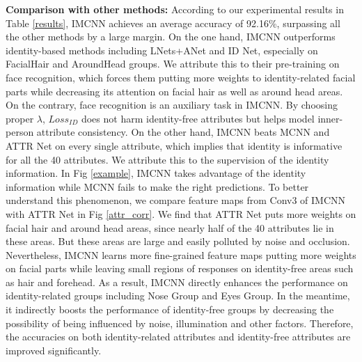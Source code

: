 \documentclass[wcp]{jmlr}
\begin{document}
	\textbf{Comparison with other methods:} According to our experimental results in Table \ref{results}, IMCNN achieves an average accuracy of 92.16\%, surpassing all the other methods by a large margin. On the one hand, IMCNN outperforms identity-based methods including LNets+ANet and ID Net, especially on FacialHair and AroundHead groups. We attribute this to their pre-training on face recognition, which forces them putting more weights to identity-related facial parts while decreasing its attention on facial hair as well as around head areas. On the contrary, face recognition is an auxiliary task in IMCNN. By choosing proper $\lambda$, $Loss_{ID}$ does not harm identity-free attributes but helps model inner-person attribute consistency. On the other hand, IMCNN beats MCNN and ATTR Net on every single attribute, which implies that identity is informative for all the 40 attributes. We attribute this to the supervision of the identity information. In Fig \ref{example}, IMCNN takes advantage of the identity information while MCNN fails to make the right predictions. To better understand this phenomenon, we compare feature maps from Conv3 of IMCNN with ATTR Net in Fig \ref{attr_corr}. We find that ATTR Net puts more weights on facial hair and around head areas, since nearly half of the 40 attributes lie in these areas. But these areas are large and easily polluted by noise and occlusion. Nevertheless, IMCNN learns more fine-grained feature maps putting more weights on facial parts while leaving small regions of responses on identity-free areas such as hair and forehead. As a result, IMCNN directly enhances the performance on identity-related groups including Nose Group and Eyes Group. In the meantime, it indirectly boosts the performance of identity-free groups by decreasing the possibility of being influenced by noise, illumination and other factors. Therefore, the accuracies on both identity-related attributes and identity-free attributes are improved significantly.
\end{document}
